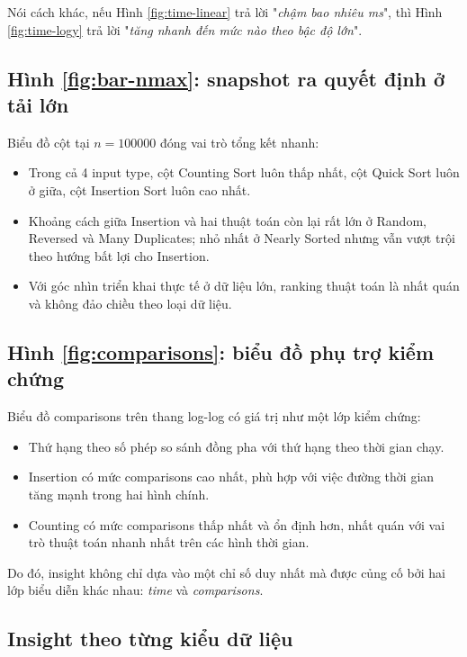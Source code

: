 Nói cách khác, nếu Hình \ref{fig:time-linear} trả lời "\textit{chậm bao nhiêu ms}", thì Hình \ref{fig:time-logy} trả lời "\textit{tăng nhanh đến mức nào theo bậc độ lớn}".

\subsection{Hình \ref{fig:bar-nmax}: snapshot ra quyết định ở tải lớn}

Biểu đồ cột tại $n=100000$ đóng vai trò tổng kết nhanh:
\begin{itemize}[leftmargin=1.2cm]
    \item Trong cả 4 input type, cột Counting Sort luôn thấp nhất, cột Quick Sort luôn ở giữa, cột Insertion Sort luôn cao nhất.
    \item Khoảng cách giữa Insertion và hai thuật toán còn lại rất lớn ở Random, Reversed và Many Duplicates; nhỏ nhất ở Nearly Sorted nhưng vẫn vượt trội theo hướng bất lợi cho Insertion.
    \item Với góc nhìn triển khai thực tế ở dữ liệu lớn, ranking thuật toán là nhất quán và không đảo chiều theo loại dữ liệu.
\end{itemize}

\subsection{Hình \ref{fig:comparisons}: biểu đồ phụ trợ kiểm chứng}

Biểu đồ comparisons trên thang log-log có giá trị như một lớp kiểm chứng:
\begin{itemize}[leftmargin=1.2cm]
    \item Thứ hạng theo số phép so sánh đồng pha với thứ hạng theo thời gian chạy.
    \item Insertion có mức comparisons cao nhất, phù hợp với việc đường thời gian tăng mạnh trong hai hình chính.
    \item Counting có mức comparisons thấp nhất và ổn định hơn, nhất quán với vai trò thuật toán nhanh nhất trên các hình thời gian.
\end{itemize}

Do đó, insight không chỉ dựa vào một chỉ số duy nhất mà được củng cố bởi hai lớp biểu diễn khác nhau: \textit{time} và \textit{comparisons}.

\subsection{Insight theo từng kiểu dữ liệu}

